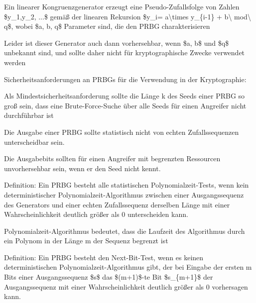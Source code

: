 \documentclass[a4paper]{article}
\begin{document}
\begin{multicols}{3}
\begin{itemize*}
\begin{itemize*}
                  \item Ein linearer Kongruenzgenerator erzeugt eine Pseudo-Zufallsfolge von Zahlen \$y\_1,y\_2, ...\$ gemäß der linearen Rekursion \$y\_i= a\textbackslash times y\_\{i-1\} + b\textbackslash{} mod\textbackslash{} q\$, wobei \$a, b, q\$ Parameter sind, die den PRBG charakterisieren
                  \item Leider ist dieser Generator auch dann vorhersehbar, wenn \$a, b\$ und \$q\$ unbekannt sind, und sollte daher nicht für kryptographische Zwecke verwendet werden
            \end{itemize*}
            \item Sicherheitsanforderungen an PRBGs für die Verwendung in der
            Kryptographie:
            \begin{itemize*}
                  \item Als Mindestsicherheitsanforderung sollte die Länge k des Seeds einer PRBG so groß sein, dass eine Brute-Force-Suche über alle Seeds für einen Angreifer nicht durchführbar ist
                  \item Die Ausgabe einer PRBG sollte statistisch nicht von echten Zufallssequenzen unterscheidbar sein.
                  \item Die Ausgabebits sollten für einen Angreifer mit begrenzten Ressourcen unvorhersehbar sein, wenn er den Seed nicht kennt.
            \end{itemize*}
            \item Definition: Ein PRBG besteht alle statistischen Polynomialzeit-Tests,
            wenn kein deterministischer Polynomialzeit-Algorithmus zwischen einer
            Ausgangssequenz des Generators und einer echten Zufallssequenz
            derselben Länge mit einer Wahrscheinlichkeit deutlich größer als 0
            unterscheiden kann.
            \begin{itemize*}
                  \item Polynomialzeit-Algorithmus bedeutet, dass die Laufzeit des Algorithmus durch ein Polynom in der Länge m der Sequenz begrenzt ist
            \end{itemize*}
            \item Definition: Ein PRBG besteht den Next-Bit-Test, wenn es keinen
            deterministischen Polynomialzeit-Algorithmus gibt, der bei Eingabe der
            ersten m Bits einer Ausgangssequenz \$s\$ das \$(m+1)\$-te Bit
            \$s\_\{m+1\}\$ der Ausgangssequenz mit einer Wahrscheinlichkeit
            deutlich größer als 0 vorhersagen kann.

\end{itemize*}
\end{multicols}
\end{document}
